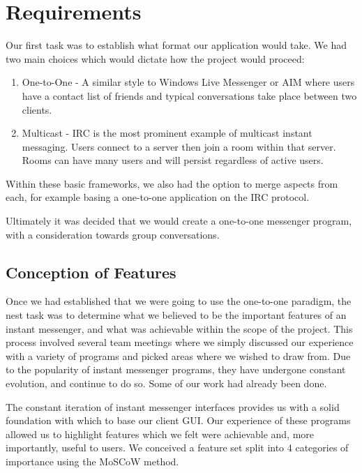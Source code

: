 \section{Requirements}

Our first task was to establish what format our application would take. We had two main choices which would dictate how the project would proceed:

\begin{enumerate}
\item{One-to-One} - A similar style to Windows Live Messenger or AIM where users have a contact list of friends and typical conversations take place between two clients. 
\item{Multicast}  - IRC is the most prominent example of multicast instant messaging. Users connect to a server then join a room within that server. Rooms can have many users and will persist regardless of active users.
\end{enumerate}

Within these basic frameworks, we also had the option to merge aspects from each, for example basing a one-to-one application on the IRC protocol.

Ultimately it was decided that we would create a one-to-one messenger program, with a consideration towards group conversations. 

\subsection{Conception of Features}

Once we had established that we were going to use the one-to-one paradigm, the nest task was to determine what we believed to be the important features of an instant messenger, and what was achievable within the scope of the project. This process involved several team meetings where we simply discussed our experience with a variety of programs and picked areas where we wished to draw from. Due to the popularity of instant messenger programs, they have undergone constant evolution, and continue to do so. Some of our work had already been done.

The constant iteration of instant messenger interfaces provides us with a solid foundation with which to base our client GUI. Our experience of these programs allowed us to highlight features which we felt were achievable and, more importantly, useful to users. We conceived a feature set split into 4 categories of importance using the MoSCoW method.

